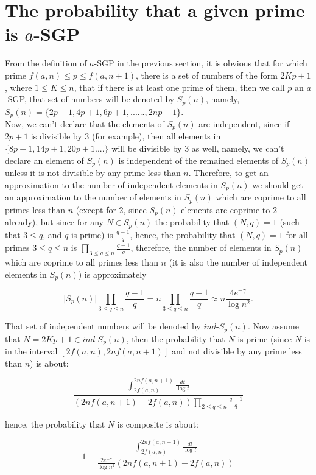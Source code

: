 \documentclass{amsart}
\numberwithin{equation}{section}
\begin{document}
\section{The probability that a given prime is $a$-SGP}

From the definition of $a$-SGP in the previous section, it is obvious that for which prime $f(a,n) \leq p \leq f(a,n+1)$, there is a set of numbers of the form $2Kp+1$, where $1 \leq K \leq n$, that if there is at least one prime of them, then we call $p$ an $a$-SGP, that set of numbers will be denoted by $S_p(n)$, namely, $S_p(n)=\{2p+1, 4p+1, 6p+1, ...... , 2np+1\}$. \\  
Now, we can't declare that the elements of $S_p(n)$ are independent, since if $2p+1$ is divisible by $3$ (for example), then all elements in $\{8p+1, 14p+1, 20p+1....\}$ will be divisible by $3$ as well, namely, we can't declare an element of $S_p(n)$ is independent of the remained elements of $S_p(n)$ unless it is not divisible by any prime less than $n$. Therefore, to get an approximation to the number of independent elements in $S_p(n)$ we should get an approximation to the number of elements in $S_p(n)$ which are coprime to all primes less than $n$ (except for 2, since $S_p(n)$ elements are coprime to 2 already), but since for any $N \in S_p(n)$ the probability that $(N,q)=1$ (such that $3 \le q$, and $q$ is prime) is $\frac{q-1}{q}$, hence, the probability that $(N,q)=1$ for all primes $3 \le q \le n$ is $\displaystyle{\prod_{3\leq q \leq n}^{} \frac{q-1}{q}}$, therefore, the number of elements in $S_p(n)$ which are coprime to all primes less than $n$ (it is also the number of independent elements in $S_p(n)$) is approximately     

\[
\lvert S_p(n) \rvert \prod_{3\leq q \leq n}^{} \frac{q-1}{q} = n \prod_{3\leq q \leq n}^{} \frac{q-1}{q} \approx n \frac{4e^{-\gamma}}{\log n^2}. 
\]

That set of independent numbers will be denoted by $ind$-$S_p(n)$. Now assume that $N=2Kp+1 \in ind$-$S_p(n)$, then the probability that $N$ is prime (since $N$ is in the interval $[2f(a,n) , 2nf(a,n+1)]$ and not divisible by any prime less than $n$) is about:

\[
\frac{\int_{2f(a,n)}^{2nf(a,n+1)} \frac{dt}{\log t}}{ (2nf(a,n+1)-2f(a,n)) \displaystyle{\prod_{2\leq q \leq n}} \frac{q-1}{q}}
\]

hence, the probability that $N$ is composite is about:

\[
1-\frac{\int_{2f(a,n)}^{2nf(a,n+1)} \frac{dt}{\log t}}{\frac{2e^{-\gamma}}{\log n^2} (2nf(a,n+1)-2f(a,n))}
\]
\end{document}
